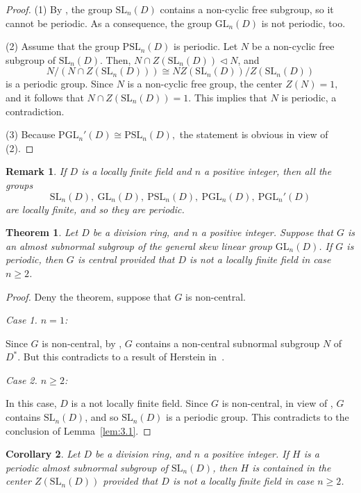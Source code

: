 \documentclass{amsart}
\newtheorem{theorem}{Theorem}[section]
\newtheorem{remark}{Remark}
\newtheorem{corollary}[theorem]{Corollary}
\theoremstyle{definition}
\begin{document}
\begin{proof} 
	(1) By \cite[4.5.1]{Pa_ShWe_86}, the group  $\mathrm{SL}_n(D)$ contains a non-cyclic free subgroup, so it cannot be periodic. As a consequence, the group $\mathrm{GL}_n(D)$ is not periodic, too.
	
	(2) Assume that the group $\mathrm{PSL}_n(D)$ is periodic. Let $N$ be a  non-cyclic free subgroup of $\mathrm{SL}_n(D)$. Then, $N\cap Z(\mathrm{SL}_n(D))\triangleleft N$, and  $$N/(N\cap Z(\mathrm{SL}_n(D)))\cong NZ(\mathrm{SL}_n(D))/Z(\mathrm{SL}_n(D))$$
	is a periodic group. Since $N$ is a non-cyclic free group, the center $Z(N)=1,$ and it follows that $N\cap Z(\mathrm{SL}_n(D))=1.$ This implies that $N$ is periodic, a contradiction. 
	
	(3) Because $\mathrm{PGL}_n'(D)\cong \mathrm{PSL}_n(D),$ the statement is obvious in view of (2).
\end{proof}
\begin{remark} If $D$ is a locally finite field and $n$ a positive integer, then all the groups $$\mathrm{SL}_n(D),\ \mathrm{GL}_n(D),\ \mathrm{PSL}_n(D),\ \mathrm{PGL}_n(D),\ \mathrm{PGL}_n'(D)$$ are locally finite, and so they are periodic.
\end{remark}
\begin{theorem}\label{th:3.2} Let $D$ be a division ring, and $n$ a positive integer. Suppose that $G$ is an almost subnormal subgroup of the  general skew linear group $\mathrm{GL}_n(D)$. If $G$ is periodic, then $G$ is central provided that $D$ is not a locally finite field in case $n\ge 2$.
\end{theorem}
\begin{proof} Deny the theorem, suppose that $G$ is non-central. 
	
	\textit{Case 1. $n=1$:}
	
	Since $G$ is non-central, by \cite[Theorem 2.1]{Pa_ChNaHa_24}, $G$ contains a non-central subnormal subgroup $N$ of $D^*$. But this contradicts to a result of Herstein in~\cite[Theorem 8]{Pa_Herstein_1978}. 
	
	\textit{Case 2. $n\ge 2$:}
	
	In this case, $D$ is a not locally finite field. Since $G$ is non-central, in view of \cite[Theorem~3.3]{Pa_nbh_17}, $G$ contains  $\mathrm{SL}_n(D)$, and so $\mathrm{SL}_n(D)$ is a periodic group. This contradicts to the conclusion of Lemma~\ref{lem:3.1}.
\end{proof}
\begin{corollary}\label{cor:3.3} Let $D$ be a division ring, and $n$ a positive integer. If $H$ is a periodic almost subnormal subgroup of $\mathrm{SL}_n(D)$, then $H$ is contained in the center $Z(\mathrm{SL}_n(D))$ provided that $D$ is not a locally finite field in case $n\ge 2$. 
\end{corollary}
\end{document}
